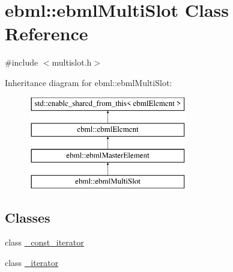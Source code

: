 \hypertarget{classebml_1_1ebmlMultiSlot}{}\section{ebml\+:\+:ebml\+Multi\+Slot Class Reference}
\label{classebml_1_1ebmlMultiSlot}


{\ttfamily \#include $<$multislot.\+h$>$}

Inheritance diagram for ebml\+:\+:ebml\+Multi\+Slot\+:\begin{figure}[H]
\begin{center}
\leavevmode
\includegraphics[height=4.000000cm]{classebml_1_1ebmlMultiSlot}
\end{center}
\end{figure}
\subsection*{Classes}
\begin{DoxyCompactItemize}
\item 
class \mbox{\hyperlink{classebml_1_1ebmlMultiSlot_1_1__const__iterator}{\+\_\+const\+\_\+iterator}}
\item 
class \mbox{\hyperlink{classebml_1_1ebmlMultiSlot_1_1__iterator}{\+\_\+iterator}}
\end{DoxyCompactItemize}
